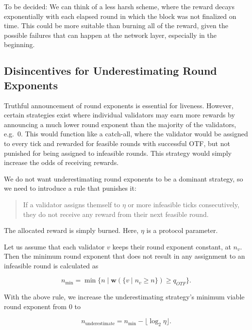 \documentclass[12pt]{article}
\begin{document}
To be decided: We can think of a less harsh scheme, where the reward decays exponentially with each elapsed round in which the block was not finalized on time. This could be more suitable than burning all of the reward, given the possible failures that can happen at the network layer, especially in the beginning.

\subsection{Disincentives for Underestimating Round Exponents}
\label{disincentivizing-validators-from-underestimating-round-exponents}

Truthful announcement of round exponents is essential for liveness. However, certain strategies exist where individual validators may earn more rewards by announcing a much lower round exponent than the majority of the validators, e.g.~0. This would function like a catch-all, where the validator would be assigned to every tick and rewarded for feasible rounds with successful OTF, but not punished for being assigned to infeasible rounds. This strategy would simply increase the odds of receiving rewards.

We do not want underestimating round exponents to be a dominant strategy, so we need to introduce a rule that punishes it:

\begin{quote}
If a validator assigns themself to $\eta$ or more infeasible ticks consecutively, they do not receive any reward from their next feasible round.
\end{quote}

The allocated reward is simply burned. Here, $\eta$ is a protocol parameter.

Let us assume that each validator $v$ keeps their round exponent constant, at $n_v$. Then the minimum round exponent that does not result in any assignment to an infeasible round is calculated as

\begin{equation}
  n_{\min} = \min\{n \mid  \boldsymbol{w}(\{v\mid n_v \geq n\}) \geq q_{OTF} \}.
\end{equation}

With the above rule, we increase the underestimating strategy's minimum viable round exponent from 0 to

\begin{equation}
  n_\text{underestimate} = n_{\min}-\lfloor \log_2\eta\rfloor.
\end{equation}
\end{document}
